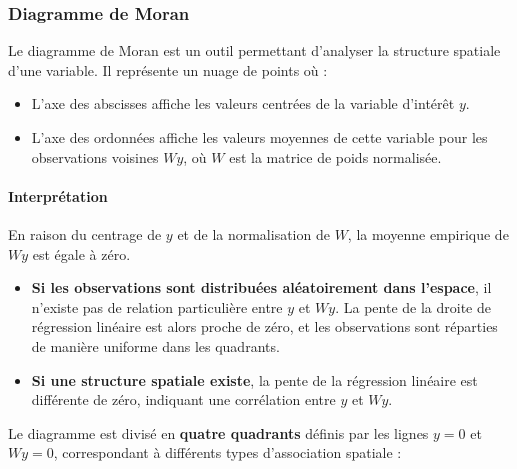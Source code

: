 \documentclass[
]{article}
\providecommand{\tightlist}{%
  \setlength{\itemsep}{0pt}\setlength{\parskip}{0pt}}
\begin{document}
\subsubsection{Diagramme de Moran}\label{diagramme-de-moran}

Le diagramme de Moran est un outil permettant d'analyser la structure
spatiale d'une variable. Il représente un nuage de points où :

\begin{itemize}
\tightlist
\item
  L'axe des abscisses affiche les valeurs centrées de la variable
  d'intérêt \(y\).\\
\item
  L'axe des ordonnées affiche les valeurs moyennes de cette variable
  pour les observations voisines \(W y\), où \(W\) est la matrice de
  poids normalisée.
\end{itemize}

\paragraph{Interprétation}\label{interpruxe9tation}

En raison du centrage de \(y\) et de la normalisation de \(W\), la
moyenne empirique de \(W y\) est égale à zéro.

\begin{itemize}
\tightlist
\item
  \textbf{Si les observations sont distribuées aléatoirement dans
  l'espace}, il n'existe pas de relation particulière entre \(y\) et
  \(W y\). La pente de la droite de régression linéaire est alors proche
  de zéro, et les observations sont réparties de manière uniforme dans
  les quadrants.\\
\item
  \textbf{Si une structure spatiale existe}, la pente de la régression
  linéaire est différente de zéro, indiquant une corrélation entre \(y\)
  et \(W y\).
\end{itemize}

Le diagramme est divisé en \textbf{quatre quadrants} définis par les
lignes \(y = 0\) et \(W y = 0\), correspondant à différents types
d'association spatiale :
\end{document}
